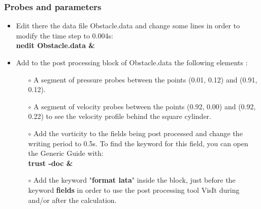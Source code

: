 \documentclass[10pt, hyperref={unicode=true,pdfusetitle, bookmarks=true,bookmarksnumbered=false,bookmarksopen=false, breaklinks=false,pdfborder={0 0 1},backref=true,colorlinks=true,linkcolor=darkblue,pageanchor}]{beamer}
\begin{document}
\begin{frame}
\frametitle{Probes and parameters}
\begin{block}{}

\begin{itemize}
\item Edit there the data file Obstacle.data and change some lines in order to modify the time step to 0.004s:\\
\textbf{nedit Obstacle.data \&}\\

\item Add to the post processing block of Obstacle.data the following elements :\\

    \begin{itemize}
    \item [$\circ$] A segment of pressure probes between the points (0.01, 0.12) and (0.91, 0.12).
    \vspace{0.1cm}

    \item [$\circ$] A segment of velocity probes between the points (0.92, 0.00) and (0.92, 0.22) to see the velocity profile behind the square cylinder.
    \vspace{0.1cm}

    \item [$\circ$] Add the vorticity to the fields being post processed and change the writing period to 0.5s. To find the keyword for this field, you can open the Generic Guide with:\\
    \textbf{trust -doc \&}
    \vspace{0.1cm}

    \item [$\circ$] Add the keyword "\textbf{format lata}" inside the block, just before the keyword \textbf{fields} in order to use the post processing tool VisIt during and/or after the calculation.
    \vspace{0.1cm}
    \end{itemize}
\end{itemize}

\end{block}
\end{frame}
\end{document}
